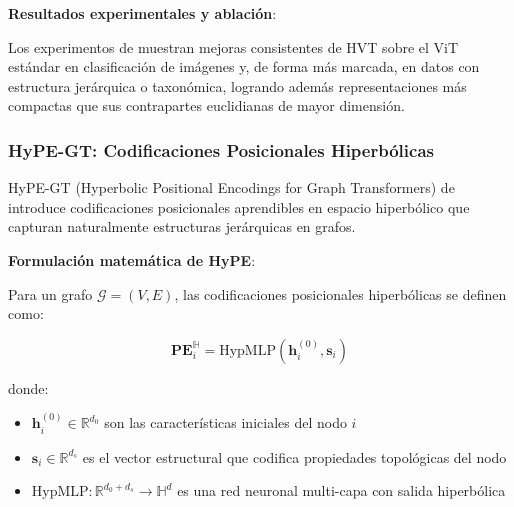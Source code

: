 \textbf{Resultados experimentales y ablación}:

Los experimentos de \citet{hvt2024hyperbolic} muestran mejoras consistentes de HVT sobre el \gls{ViT} estándar en clasificación de imágenes y, de forma más marcada, en datos con estructura jerárquica o taxonómica, logrando además representaciones más compactas que sus contrapartes euclidianas de mayor dimensión.

\subsubsection{HyPE-GT: Codificaciones Posicionales Hiperbólicas}

HyPE-GT (Hyperbolic Positional Encodings for Graph Transformers) de \citet{hypegt2023} introduce codificaciones posicionales aprendibles en espacio hiperbólico que capturan naturalmente estructuras jerárquicas en grafos.

\textbf{Formulación matemática de HyPE}:

\begin{definition}\label{def:hype_encoding}
Para un grafo $\mathcal{G} = (V, E)$, las codificaciones posicionales hiperbólicas se definen como:

\begin{equation}
    \mathbf{PE}_i^{\mathbb{H}} = \text{HypMLP}(\mathbf{h}_i^{(0)}, \mathbf{s}_i)
    \label{eq:hyperbolic_positional_encoding}
\end{equation}

donde:
\begin{itemize}
    \item $\mathbf{h}_i^{(0)} \in \mathbb{R}^{d_0}$ son las características iniciales del nodo $i$
    \item $\mathbf{s}_i \in \mathbb{R}^{d_s}$ es el vector estructural que codifica propiedades topológicas del nodo
    \item $\text{HypMLP}: \mathbb{R}^{d_0 + d_s} \to \mathbb{H}^d$ es una red neuronal multi-capa con salida hiperbólica
\end{itemize}
\end{definition}

